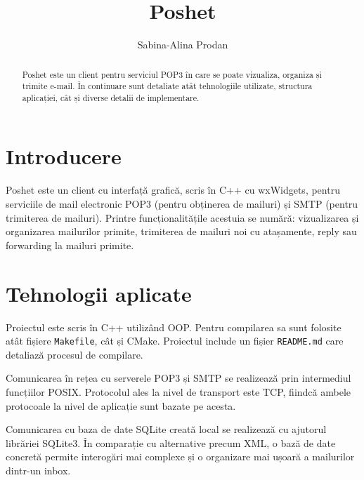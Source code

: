 \documentclass[runningheads]{llncs}
\begin{document}
%
\title{Poshet}
%
%
\author{Sabina-Alina Prodan}
%
%
%
\maketitle              %
%
\begin{abstract}
Poshet este un client pentru serviciul POP3 în care se poate vizualiza, organiza și trimite e-mail. În continuare sunt detaliate atât tehnologiile utilizate, structura aplicației, cât și diverse detalii de implementare.

\renewcommand\keywordname{{\bf Cuvinte cheie:}}

\end{abstract}
%
%
%
\section{Introducere}

Poshet este un client cu interfață grafică, scris în C++ cu wxWidgets, pentru serviciile de mail electronic POP3 (pentru obținerea de mailuri) și SMTP (pentru trimiterea de mailuri). Printre funcționalitățile acestuia se numără: vizualizarea și organizarea mailurilor primite, trimiterea de mailuri noi cu atașamente, reply sau forwarding la mailuri primite.

\section{Tehnologii aplicate}

Proiectul este scris în C++ utilizând OOP. Pentru compilarea sa sunt folosite atât fișiere \texttt{Makefile}, cât și CMake. Proiectul include un fișier \texttt{README.md} care detaliază procesul de compilare.

Comunicarea în rețea cu serverele POP3 și SMTP se realizează prin intermediul funcțiilor POSIX. Protocolul ales la nivel de transport este TCP, fiindcă ambele protocoale la nivel de aplicație sunt bazate pe acesta.

Comunicarea cu baza de date SQLite creată local se realizează cu ajutorul librăriei SQLite3. În comparație cu alternative precum XML, o bază de date concretă permite interogări mai complexe și o organizare mai ușoară a mailurilor dintr-un inbox.
\end{document}
